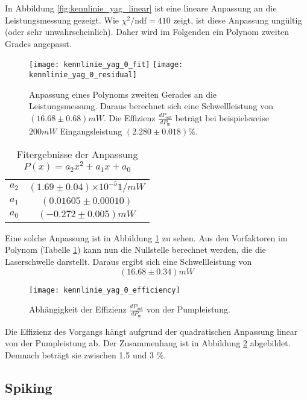 \documentclass{../Misc/MontavonLaTeX/Montavon}
\newcommand{\e}[1]{\ensuremath{\times 10^{#1}}}
\newcommand{\halfwidth}{0.48\textwidth}
\begin{document}
In Abbildung \ref{fig:kennlinie_yag_linear} ist eine lineare Anpassung an die Leistungsmessung gezeigt. Wie $\chi^2 / \textrm{ndf} = 410$ zeigt, ist diese Anpassung ungültig (oder sehr unwahrscheinlich). Daher wird im Folgenden ein Polynom zweiten Grades angepasst.

\begin{figure}
\centering
\texttt{[image: kennlinie\_yag\_0\_fit]}
\texttt{[image: kennlinie\_yag\_0\_residual]}
\caption{Anpassung eines Polynoms zweiten Gerades an die Leistungsmessung. Daraus berechnet sich eine Schwellleistung von $(16.68 \pm 0.68) \unit{mW}$. Die Effizienz $\frac{dP_\textrm{out}}{dP_\textrm{in}}$ beträgt bei beispielsweise $200 \unit{mW}$ Eingangsleistung $(2.280 \pm 0.018) \%$.}
\label{fig:kennlinie_yag_0}
\end{figure}

\begin{table}
\centering
\begin{tabular}{|c|c|}
\hline
$a_2$ & $(1.69 \pm 0.04) \e{-5} \unit{1/mW} $ \\
$a_1$ & $(0.01605 \pm 0.00010) $ \\
$a_0$ & $(-0.272 \pm 0.005) \unit{mW}$ \\ \hline
\end{tabular}
\caption{Fitergebnisse der Anpassung $P(x) = a_2 x^2 + a_1 x + a_0$}
\label{tbl:polynom}
\end{table}

Eine solche Anpassung ist in Abbildung \ref{fig:kennlinie_yag_0} zu sehen. Aus den Vorfaktoren im Polynom (Tabelle \ref{tbl:polynom}) kann nun die Nullstelle berechnet werden, die die Laserschwelle darstellt. Daraus ergibt sich eine Schwellleistung von
\[
	(16.68 \pm 0.34) \unit{mW}
\]

\begin{figure}
\centering
\texttt{[image: kennlinie\_yag\_0\_efficiency]}
\caption{Abhängigkeit der Effizienz $\frac{dP_\textrm{out}}{dP_\textrm{in}}$ von der Pumpleistung.}
\label{fig:kennlinie_yag_0_efficiency}
\end{figure}

Die Effizienz des Vorgangs hängt aufgrund der quadratischen Anpassung linear von der Pumpleistung ab. Der Zusammenhang ist in Abbildung \ref{fig:kennlinie_yag_0_efficiency} abgebildet. Demnach beträgt sie zwischen 1.5 und 3 $\unit{\%}$.

\subsection{Spiking}
\end{document}
